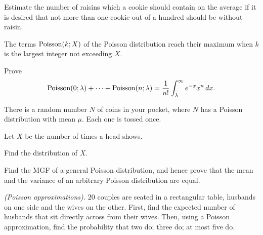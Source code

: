 \begin{problem}[Handout 10, \# 9]
  Estimate the number of raisins which a cookie should contain on the
  average if it is desired that not more than one cookie out of a hundred
  should be without raisin.
\end{problem}
\begin{solution*}

\end{solution*}

\begin{problem}[Handout 10, \# 10]
  The terms \(\operatorname{Poisson}(k;X)\) of the Poisson distribution reach their
  maximum when \(k\) is the largest integer not exceeding \(X\).
\end{problem}
\begin{solution*}

\end{solution*}

\begin{problem}[Handout 10, \# 11]
  Prove
  \[
    \operatorname{Poisson}(0;\lambda)+\dotsb+\operatorname{Poisson}(n;\lambda)
    =\frac{1}{n!}\int_\lambda^\infty e^{-x}x^n\mathop{}\!d x.
  \]
\end{problem}
\begin{solution*}

\end{solution*}

\begin{problem}[Handout 10, \# 12]
  There is a random number \(N\) of coins in your pocket, where \(N\) has a
  Poisson distribution with mean \(\mu\). Each one is tossed once.

  \noindent Let \(X\) be the number of times a head shows.

  \noindent Find the distribution of \(X\).
\end{problem}
\begin{solution*}

\end{solution*}

\begin{problem}[Handout 10, \# 14]
  Find the MGF of a general Poisson distribution, and hence prove that the
  mean and the variance of an arbitrary Poisson distribution are equal.
\end{problem}
\begin{solution*}

\end{solution*}

\begin{problem}[Handout 10, \# 17 (a)]
  \emph{(Poisson approximations).} \(20\) couples are seated in a
  rectangular table, husbands on one side and the wives on the
  other. First, find the expected number of husbands that sit directly
  across from their wives. Then, using a Poisson approximation, find the
  probability that two do; three do; at most five do.
\end{problem}
\begin{solution*}

\end{solution*}

